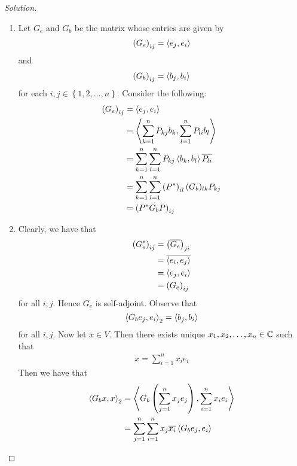 \begin{proof}[Solution]
    \begin{enumerate}[label=(\alph*)]
	\item Let $G_e$ and $G_b$ be the matrix whose entries are given by
   \begin{align*}
       \left( G_{e} \right)_{ij} = \left\langle e_{j}, e_{i} \right\rangle
   \end{align*}
   and 
   \begin{align*}
       \left( G_{b} \right)_{ij} = \left\langle b_{j}, b_{i} \right\rangle
   \end{align*}
   for each $i,j \in \left\{ 1,2,\ldots , n \right\}$.
   Consider the following:
   \begin{align*}
       \left( G_{e} \right) _{ij} &= \left\langle e_{j}, e_{i} \right\rangle  \\
       &= \left\langle \sum_{k=1}^{n} P_{kj} b_{k}, \sum_{l=1}^{n} P_{li} b_{l} \right\rangle \\
       &= \sum_{k=1}^{n} \sum_{l=1}^{n} P_{kj} \left\langle b_{k}, b_{l} \right\rangle \overline{P_{li}} \\
       &= \sum_{k=1}^{n} \sum_{l=1}^{n} \left( P^{*} \right)_{il} (G_{b} )_{lk} P_{kj} \\
       &= \left( P^{*} G_{b} P \right)_{ij}
   \end{align*}
   \item Clearly, we have that 
       \begin{align*}
	   \left( G_{e} ^{*} \right)_{ij} &= \left( \overline{G_{e}} \right) _{ji} \\
	   &= \overline{\left\langle e_{i}, e_{j} \right\rangle} \\
       &= \left\langle e_{j}, e_{i} \right\rangle \\
	   &=  \left( G_{e} \right)_{ij}
       \end{align*}
       for all $i,j$. Hence $G_{e}$ is self-adjoint. Observe that
       \begin{equation*}
	   \left\langle G_{b} e_{j} , e_{i} \right\rangle_{2} = \left\langle b_{j}, b_{i} \right\rangle
       \end{equation*}
       for all $i,j$. Now let $x\in V$. Then there exists unique $x_{1}, x_{2}, \ldots , x_{n}  \in \mathbb C$ such that
       \begin{align*}
	   x= \sum_{i=1}^{n} x_{i}e_{i}
       \end{align*}
        Then we have that
	\begin{align*}
	    \ip{G_{b} x , x}_{2} &= \ip{G_{b} \left( \sum_{j=1}^{n}  x_{j} e_{j}  \right), \sum_{i=1}^{n} x_{i} e_{i}} \\
	    &= \sum_{j=1}^{n} \sum_{i=1}^{n} x_{j}\overline{x_{i}} \ip{G_{b} e_{j}, e_{i}} \\

\end{align*}
\end{enumerate}
\end{proof}

